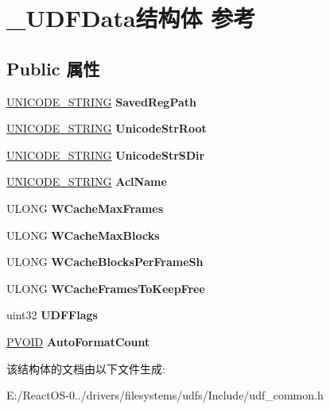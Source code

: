 \hypertarget{struct___u_d_f_data}{}\section{\+\_\+\+U\+D\+F\+Data结构体 参考}
\label{struct___u_d_f_data}
\subsection*{Public 属性}
\begin{DoxyCompactItemize}
\item 
\mbox{\label{struct___u_d_f_data_a03486961ead68a501bd17ca1a5fde315}} 
\hyperlink{struct___u_n_i_c_o_d_e___s_t_r_i_n_g}{U\+N\+I\+C\+O\+D\+E\+\_\+\+S\+T\+R\+I\+NG} {\bfseries Saved\+Reg\+Path}
\item 
\mbox{\label{struct___u_d_f_data_af6a0e588a4a6b1ebe6c40de74b902b20}} 
\hyperlink{struct___u_n_i_c_o_d_e___s_t_r_i_n_g}{U\+N\+I\+C\+O\+D\+E\+\_\+\+S\+T\+R\+I\+NG} {\bfseries Unicode\+Str\+Root}
\item 
\mbox{\label{struct___u_d_f_data_a85bb1e0f3e7925d057dd2cebb80137ad}} 
\hyperlink{struct___u_n_i_c_o_d_e___s_t_r_i_n_g}{U\+N\+I\+C\+O\+D\+E\+\_\+\+S\+T\+R\+I\+NG} {\bfseries Unicode\+Str\+S\+Dir}
\item 
\mbox{\label{struct___u_d_f_data_a2e07dab46a72db7607b90420fd2277ce}} 
\hyperlink{struct___u_n_i_c_o_d_e___s_t_r_i_n_g}{U\+N\+I\+C\+O\+D\+E\+\_\+\+S\+T\+R\+I\+NG} {\bfseries Acl\+Name}
\item 
\mbox{\label{struct___u_d_f_data_a930fc3a6063d654cf3a8d09a6ee21531}} 
U\+L\+O\+NG {\bfseries W\+Cache\+Max\+Frames}
\item 
\mbox{\label{struct___u_d_f_data_adfcb7bfdb3f7ec4340d45a05edacf11f}} 
U\+L\+O\+NG {\bfseries W\+Cache\+Max\+Blocks}
\item 
\mbox{\label{struct___u_d_f_data_a70b7f1332f359a2290bcacd10cf1c534}} 
U\+L\+O\+NG {\bfseries W\+Cache\+Blocks\+Per\+Frame\+Sh}
\item 
\mbox{\label{struct___u_d_f_data_a5e82ccf414a57a8a43a604ce75b11aab}} 
U\+L\+O\+NG {\bfseries W\+Cache\+Frames\+To\+Keep\+Free}
\item 
\mbox{\label{struct___u_d_f_data_af94a2d908268e3f9ed691389d0115330}} 
uint32 {\bfseries U\+D\+F\+Flags}
\item 
\mbox{\label{struct___u_d_f_data_a5ffde451f8a29ccdf162c6067b984b89}} 
\hyperlink{interfacevoid}{P\+V\+O\+ID} {\bfseries Auto\+Format\+Count}
\end{DoxyCompactItemize}


该结构体的文档由以下文件生成\+:\begin{DoxyCompactItemize}
\item 
E\+:/\+React\+O\+S-\/0../drivers/filesystems/udfs/\+Include/udf\+\_\+common.\+h\end{DoxyCompactItemize}
